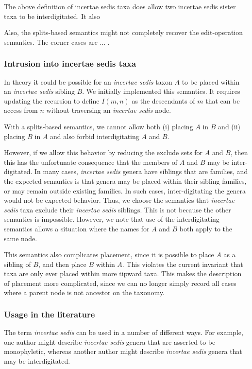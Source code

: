 \documentclass[english]{article}
\begin{document}
The above definition of incertae sedis taxa does allow two incertae
sedis sister taxa to be interdigitated.
It also

Also, the splits-based semantics might not completely recover the
edit-operation semantics.
The corner cases are ...
.

\subsubsection{Intrusion into incertae sedis taxa}

In theory it could be possible for an \emph{incertae sedis} taxon $A$
to be placed within an \emph{incertae sedis} sibling $B$.
We initially
implemented this semantics.
It requires updating the recursion to
define $I(m,n)$ as the descendants of $m$ that can be access from $n$
without traversing an \emph{incertae sedis} node.

With a splits-based semantics, we cannot allow both (i) placing $A$ in
$B$ and (ii) placing $B$ in $A$ and also forbid interdigitating $A$
and $B$.

However, if we allow this behavior by reducing the exclude sets for
$A$ and $B$, then this has the unfortunate consequence that the
members of $A$ and $B$ may be inter-digitated.
In many cases,
\emph{incertae sedis} genera have siblings that are families, and the
expected semantics is that genera may be placed within their sibling
families, or may remain outside existing families.
In such cases,
inter-digitating the genera would not be expected behavior.
Thus, we
choose the semantics that \emph{incertae sedis} taxa exclude their
\emph{incertae sedis} siblings.
This is not because the other
semantics is impossible.
However, we note that use of the
interdigitating semantics allows a situation where the names for $A$
and $B$ both apply to the same node.

This semantics also complicates placement, since it is possible to
place $A$ as a sibling of $B$, and then place $B$ within $A$.
This
violates the current invariant that taxa are only ever placed within
more tipward taxa.
This makes the description of placement more
complicated, since we can no longer simply record all cases where a
parent node is not ancestor on the taxonomy.

\subsubsection{Usage in the literature}

The term \emph{incertae sedis} can be used in a number of different
ways.
For example,\emph{ }one author might describe \emph{incertae
sedis} genera that are asserted to be monophyletic, whereas another
author might describe \emph{incertae sedis} genera that may be
interdigitated.



\end{document}
